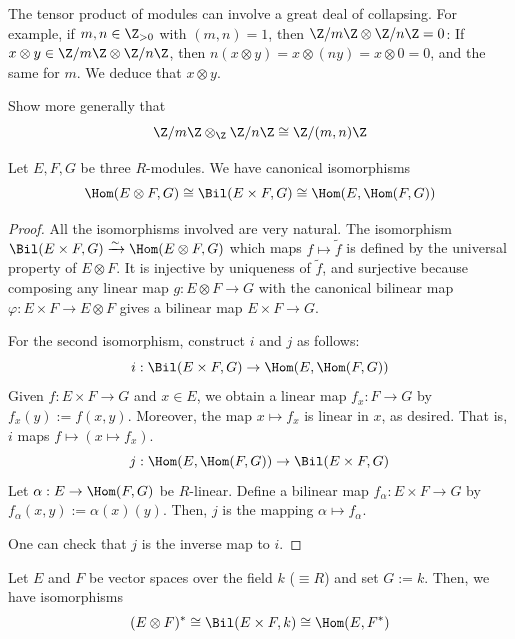 \begin{ex}
    The tensor product of modules can involve a great deal of collapsing. For example, if $m, n \in \Z_{>0}$ with $(m,n)=1$, then $\Z/m\Z \otimes \Z/n\Z = 0$: If $x \otimes y \in \Z/m\Z \otimes \Z/n\Z$, then $n(x \otimes y) = x \otimes (ny) = x \otimes 0 = 0$, and the same for $m$. We deduce that $x \otimes y$.
\end{ex}

\begin{notebox*}[Exercise]
    Show more generally that
    $$\Z/m\Z \otimes _\Z \Z/n\Z \cong \Z/(m,n)\Z$$
\end{notebox*}

\begin{thm}
    Let $E,F,G$ be three $R$-modules. We have canonical isomorphisms
    $$\Hom (E \otimes F,G) \cong \Bil (E\times F,G) \cong \Hom (E,\Hom(F,G))$$
\end{thm}

\begin{proof}
    All the isomorphisms involved are very natural. The isomorphism $\Bil (E \times F,G) \xrightarrow{\sim}\Hom (E \otimes F,G)$ which maps $f \mapsto \tilde f$ is defined by the universal property of $E \otimes F$. It is injective by uniqueness of $\tilde f$, and surjective because composing any linear map $g : E \otimes F \to G$ with the canonical bilinear map $\varphi :E \times F \to E \otimes F$ gives a bilinear map $E \times F \to G$.

    For the second isomorphism, construct $i$ and $j$ as follows:
    $$i:\Bil (E \times F,G) \to \Hom(E,\Hom (F,G))$$
    Given $f:E \times F \to G$ and $x \in E$, we obtain a linear map $f_x: F \to G$ by $f_x(y) := f(x,y)$. Moreover, the map $x \mapsto f_x$ is linear in $x$, as desired. That is, $i$ maps $f \mapsto (x \mapsto f_x)$.
    $$j: \Hom(E,\Hom(F,G)) \to \Bil(E \times F,G)$$
    Let $\alpha:E \to \Hom(F,G)$ be $R$-linear. Define a bilinear map $f_\alpha : E \times F \to G$ by $f_\alpha(x,y) := \alpha(x)(y)$. Then, $j$ is the mapping $\alpha \mapsto f_\alpha$.

    One can check that $j$ is the inverse map to $i$.
\end{proof}

\begin{ex}
    Let $E$ and $F$ be vector spaces over the field $k$ ($\equiv R$) and set $G:= k$. Then, we have isomorphisms
    $$(E \otimes F)^* \cong \Bil (E\times F , k) \cong \Hom (E,F^*)$$
\end{ex}

